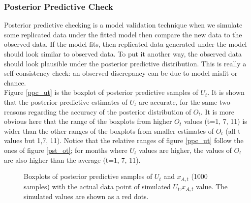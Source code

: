 \documentclass[12pt]{article}
\begin{document}
{\newpage
\subsubsection{Posterior Predictive Check}
Posterior predictive checking is a model validation technique when we simulate some replicated data under the fitted model then compare the new data to the observed data. If the model fits, then replicated data generated under the model should look similar to observed data. To put it another way, the observed data should look plausible under the posterior predictive distribution. This is really a self-consistency check: an observed discrepancy can be due to model misfit or chance. \cite{bda_galman}\\

Figure \ref{ppc_ut} is the boxplot of posterior predictive samples of $U_t$. It is shown that the posterior predictive estimates of $U_t$ are accurate, for the same two reasons regarding the accuracy of the posterior distribution of $O_t$. It is more obvious here that the range of the boxplots from higher $O_t$ values (t=1, 7, 11) is wider than the other ranges of the boxplots from smaller estimates of $O_t$ (all t values but 1,7, 11). Notice that the relative ranges of figure \ref{ppc_ut} follow the ones of figure \ref{pst_ot}; for months where $U_t$ values are higher, the values of $O_t$ are also higher than the average (t=1, 7, 11).\\

\begin{figure}[htb]
	\centering
	\caption[Initial result: box plots of predictive posterior samples of $U_t$ and $x_{A,t}$]{Boxplots of posterior predictive samples of $U_t$ and $x_{A,t}$ (1000 samples) with the actual data point of simulated $U_t$,$x_{A,t}$ value. The simulated values are shown as a red dots.}
	

\end{figure}}
\end{document}
